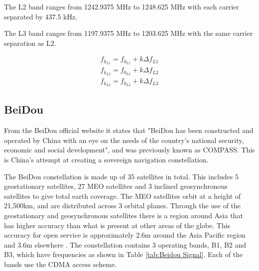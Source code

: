 The L2 band ranges from 1242.9375 MHz to 1248.625 MHz with each carrier separated by 437.5 kHz.

The L3 band ranges from 1197.9375 MHz to 1203.625 MHz with the same carrier separation as L2.

\begin{equation} 
    \begin{split} \label{eq:GLONASS Channel calc}
        f_{k_{L1}} = f_{0_{L1}} + k \Delta f_{L1} \\ 
        f_{k_{L2}} = f_{0_{L2}} + k \Delta f_{L2} \\ 
        f_{k_{L3}} = f_{0_{L3}} + k \Delta f_{L3}
    \end{split}
\end{equation}

\subsection{BeiDou} \label{subsec:GNSS_BeiDouIntro}
From the BeiDou official website it states that "BeiDou has been constructed and operated by China with an eye on the needs of the country's national security, economic
and social development", and was previously known as COMPASS. This is China's attempt at creating a sovereign navigation constellation.

The BeiDou constellation is made up of 35 satellites in total. This includes 5 geostationary satellites, 27 MEO satellites and 3 inclined geosynchronous satellites to
give total earth coverage. The MEO satellites orbit at a height of 21,500km, and are distributed across 3 orbital planes. Through the use of the geostationary and
geosynchronous satellites there is a region around Asia that has higher accuracy than what is present at other areas of the globe. This accuracy for open service is
approximately 2.6m around the Asia Pacific region and 3.6m elsewhere \cite{RN59}. The constellation contains 3 operating bands, B1, B2 and B3, which have frequencies as shown in Table
\ref{tab:Beidou Signal}. Each of the bands use the CDMA access scheme.

